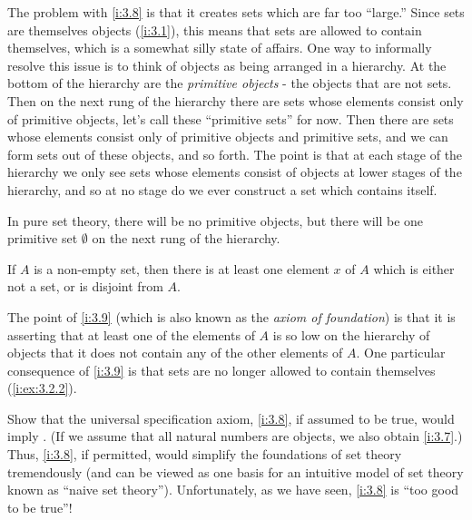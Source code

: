 \begin{note}
  The problem with \cref{i:3.8} is that it creates sets which are far too ``large.''
  Since sets are themselves objects (\cref{i:3.1}), this means that sets are allowed to contain themselves, which is a somewhat silly state of affairs.
  One way to informally resolve this issue is to think of objects as being arranged in a hierarchy.
  At the bottom of the hierarchy are the \emph{primitive objects} - the objects that are not sets.
  Then on the next rung of the hierarchy there are sets whose elements consist only of primitive objects, let's call these ``primitive sets'' for now.
  Then there are sets whose elements consist only of primitive objects and primitive sets, and we can form sets out of these objects, and so forth.
  The point is that at each stage of the hierarchy we only see sets whose elements consist of objects at lower stages of the hierarchy, and so at no stage do we ever construct a set which contains itself.
\end{note}

\begin{note}
  In pure set theory, there will be no primitive objects, but there will be one primitive set \(\emptyset\) on the next rung of the hierarchy.
\end{note}

\begin{ax}[Regularity]\label{i:3.9}
  If \(A\) is a non-empty set, then there is at least one element \(x\) of \(A\) which is either not a set, or is disjoint from \(A\).
\end{ax}

\begin{note}
  The point of \cref{i:3.9} (which is also known as the \emph{axiom of foundation}) is that it is asserting that at least one of the elements of \(A\) is so low on the hierarchy of objects that it does not contain any of the other elements of \(A\).
  One particular consequence of \cref{i:3.9} is that sets are no longer allowed to contain themselves (\cref{i:ex:3.2.2}).
\end{note}

\exercisesection

\begin{ex}\label{i:ex:3.2.1}
  Show that the universal specification axiom, \cref{i:3.8}, if assumed to be true, would imply .
  (If we assume that all natural numbers are objects, we also obtain \cref{i:3.7}.)
  Thus, \cref{i:3.8}, if permitted, would simplify the foundations of set theory tremendously (and can be viewed as one basis for an intuitive model of set theory known as ``naive set theory'').
  Unfortunately, as we have seen, \cref{i:3.8} is ``too good to be true''!
\end{ex}

